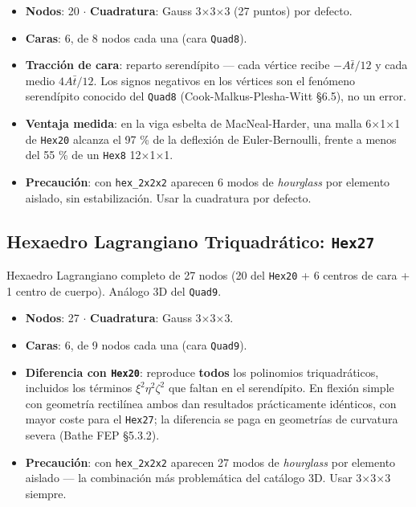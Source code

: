 \documentclass[11pt,oneside]{report}
\begin{document}
\begin{itemize}
  \item \textbf{Nodos}: 20 \ensuremath{\cdot} \textbf{Cuadratura}: Gauss 3\ensuremath{\times}3\ensuremath{\times}3 (27 puntos) por defecto.
  \item \textbf{Caras}: 6, de 8 nodos cada una (cara \texttt{Quad8}).
  \item \textbf{Tracción de cara}: reparto serendípito --- cada vértice recibe $-A\bar{t}/12$ y cada medio $4A\bar{t}/12$. Los signos negativos en los vértices son el fenómeno serendípito conocido del \texttt{Quad8} (Cook-Malkus-Plesha-Witt §6.5), no un error.
  \item \textbf{Ventaja medida}: en la viga esbelta de MacNeal-Harder, una malla 6\ensuremath{\times}1\ensuremath{\times}1 de \texttt{Hex20} alcanza el 97 \% de la deflexión de Euler-Bernoulli, frente a menos del 55 \% de un \texttt{Hex8} 12\ensuremath{\times}1\ensuremath{\times}1.
  \item \textbf{Precaución}: con \texttt{hex\_2x2x2} aparecen 6 modos de \textit{hourglass} por elemento aislado, sin estabilización. Usar la cuadratura por defecto.
\end{itemize}

\subsection{Hexaedro Lagrangiano Triquadrático: \texttt{Hex27}}

Hexaedro Lagrangiano completo de 27 nodos (20 del \texttt{Hex20} + 6 centros de cara + 1 centro de cuerpo). Análogo 3D del \texttt{Quad9}.

\begin{itemize}
  \item \textbf{Nodos}: 27 \ensuremath{\cdot} \textbf{Cuadratura}: Gauss 3\ensuremath{\times}3\ensuremath{\times}3.
  \item \textbf{Caras}: 6, de 9 nodos cada una (cara \texttt{Quad9}).
  \item \textbf{Diferencia con \texttt{Hex20}}: reproduce \textbf{todos} los polinomios triquadráticos, incluidos los términos $\xi^2\eta^2\zeta^2$ que faltan en el serendípito. En flexión simple con geometría rectilínea ambos dan resultados prácticamente idénticos, con mayor coste para el \texttt{Hex27}; la diferencia se paga en geometrías de curvatura severa (Bathe FEP §5.3.2).
  \item \textbf{Precaución}: con \texttt{hex\_2x2x2} aparecen 27 modos de \textit{hourglass} por elemento aislado --- la combinación más problemática del catálogo 3D. Usar 3\ensuremath{\times}3\ensuremath{\times}3 siempre.
\end{itemize}
\end{document}
